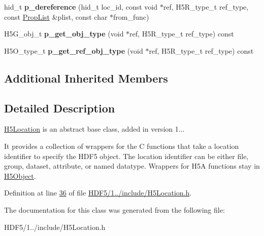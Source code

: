 \begin{DoxyCompactItemize}
hid\+\_\+t {\bfseries p\+\_\+dereference} (hid\+\_\+t loc\+\_\+id, const void $\ast$ref, H5\+R\+\_\+type\+\_\+t ref\+\_\+type, const \hyperlink{class_h5_1_1_prop_list}{Prop\+List} \&plist, const char $\ast$from\+\_\+func)
\item 
\mbox{\label{class_h5_1_1_h5_location_a2dd2a47996c102b2446ed4002d819059}} 
H5\+G\+\_\+obj\+\_\+t {\bfseries p\+\_\+get\+\_\+obj\+\_\+type} (void $\ast$ref, H5\+R\+\_\+type\+\_\+t ref\+\_\+type) const
\item 
\mbox{\label{class_h5_1_1_h5_location_a500db936b9aa7a88d75ed65c955822e1}} 
H5\+O\+\_\+type\+\_\+t {\bfseries p\+\_\+get\+\_\+ref\+\_\+obj\+\_\+type} (void $\ast$ref, H5\+R\+\_\+type\+\_\+t ref\+\_\+type) const
\end{DoxyCompactItemize}
\subsection*{Additional Inherited Members}


\subsection{Detailed Description}
\hyperlink{class_h5_1_1_h5_location}{H5\+Location} is an abstract base class, added in version 1... 

It provides a collection of wrappers for the C functions that take a location identifier to specify the H\+D\+F5 object. The location identifier can be either file, group, dataset, attribute, or named datatype. Wrappers for H5A functions stay in \hyperlink{class_h5_1_1_h5_object}{H5\+Object}. 

Definition at line \hyperlink{_h_d_f5_21_810_81_2include_2_h5_location_8h_source_l00036}{36} of file \hyperlink{_h_d_f5_21_810_81_2include_2_h5_location_8h_source}{H\+D\+F5/1../include/\+H5\+Location.\+h}.



The documentation for this class was generated from the following file\+:\begin{DoxyCompactItemize}
\item 
H\+D\+F5/1../include/\+H5\+Location.\+h\end{DoxyCompactItemize}
